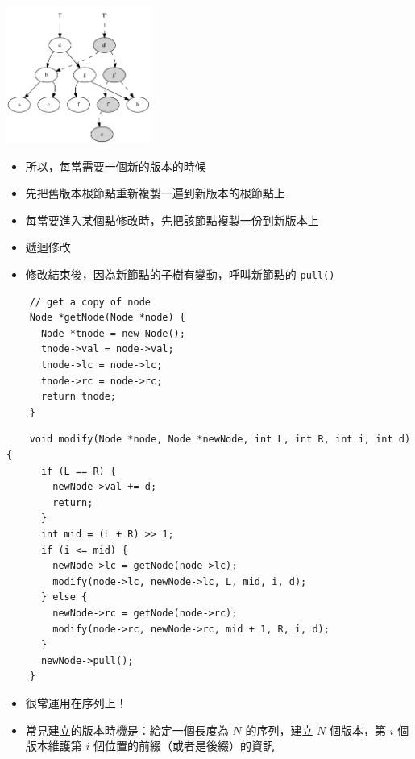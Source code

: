 \documentclass[standalone]{beamer}
\begin{document}
\begin{frame}[fragile]{}
  \includegraphics[height=4.5cm]{figures/persistent-tree.pdf}
  \begin{itemize}
    \item 所以，每當需要一個新的版本的時候
    \item 先把舊版本根節點重新複製一遍到新版本的根節點上
    \item 每當要進入某個點修改時，先把該節點複製一份到新版本上
    \item 遞迴修改
    \item 修改結束後，因為新節點的子樹有變動，呼叫新節點的 \texttt{pull()}
  \end{itemize}
\end{frame}

\begin{frame}[fragile]{}
  \begin{verbatim}
    // get a copy of node
    Node *getNode(Node *node) {
      Node *tnode = new Node();
      tnode->val = node->val;
      tnode->lc = node->lc;
      tnode->rc = node->rc;
      return tnode;
    }
  \end{verbatim}
\end{frame}

\begin{frame}[fragile]{}
  \begin{verbatim}
    void modify(Node *node, Node *newNode, int L, int R, int i, int d) {
      if (L == R) {
        newNode->val += d;
        return;
      }
      int mid = (L + R) >> 1;
      if (i <= mid) {
        newNode->lc = getNode(node->lc);
        modify(node->lc, newNode->lc, L, mid, i, d);
      } else {
        newNode->rc = getNode(node->rc);
        modify(node->rc, newNode->rc, mid + 1, R, i, d);
      }
      newNode->pull();
    }
  \end{verbatim}
\end{frame}

\begin{frame}[fragile]{}
  \begin{itemize}
    \item 很常運用在序列上！
    \item 常見建立的版本時機是：給定一個長度為 $N$ 的序列，建立 $N$ 個版本，第 $i$ 個版本維護第 $i$ 個位置的前綴（或者是後綴）的資訊
  \end{itemize}
\end{frame}
\end{document}
